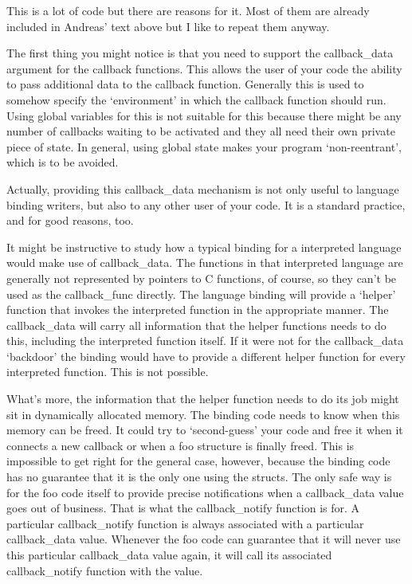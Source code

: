 \documentclass{article}
\begin{document}
This is a lot of code but there are reasons for it.  Most of them are
already included in Andreas' text above but I like to repeat them
anyway.

The first thing you might notice is that you need to support the
callback\_data argument for the callback functions.  This allows the
user of your code the ability to pass additional data to the callback
function.  Generally this is used to somehow specify the `environment'
in which the callback function should run.  Using global variables for
this is not suitable for this because there might be any number of
callbacks waiting to be activated and they all need their own private
piece of state.  In general, using global state makes your program
`non-reentrant', which is to be avoided.

Actually, providing this callback\_data mechanism is not only useful to
language binding writers, but also to any other user of your code.  It
is a standard practice, and for good reasons, too.

It might be instructive to study how a typical binding for a
interpreted language would make use of callback\_data.  The functions
in that interpreted language are generally not represented by pointers
to C functions, of course, so they can't be used as the callback\_func
directly.  The language binding will provide a `helper' function that
invokes the interpreted function in the appropriate manner.  The
callback\_data will carry all information that the helper functions
needs to do this, including the interpreted function itself.  If it
were not for the callback\_data `backdoor' the binding would have to
provide a different helper function for every interpreted function.
This is not possible.

What's more, the information that the helper function needs to do its
job might sit in dynamically allocated memory.  The binding code needs
to know when this memory can be freed.  It could try to `second-guess'
your code and free it when it connects a new callback or when a foo
structure is finally freed.  This is impossible to get right for the
general case, however, because the binding code has no guarantee that
it is the only one using the structs.  The only safe way is for the
foo code itself to provide precise notifications when a callback\_data
value goes out of business.  That is what the callback\_notify
function is for.  A particular callback\_notify function is always
associated with a particular callback\_data value.  Whenever the foo
code can guarantee that it will never use this particular
callback\_data value again, it will call its associated
callback\_notify function with the value.
\end{document}
